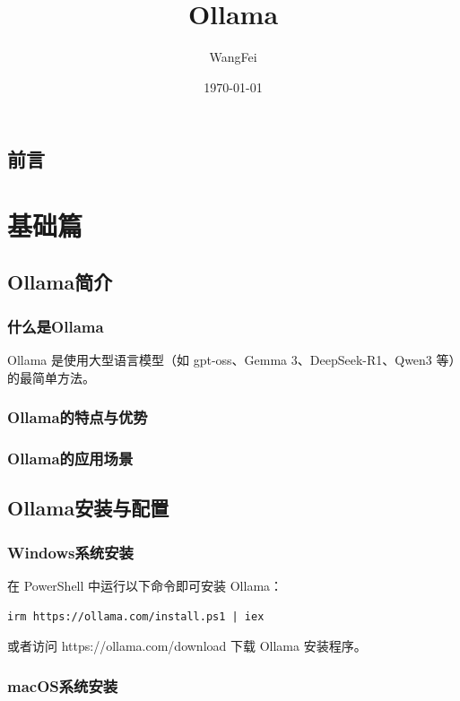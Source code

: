 \documentclass[12pt,UTF8]{ctexbook}
\title{\heiti\zihao{0} Ollama}
\author{WangFei}
\date{\today}
\begin{document}
\maketitle
\tableofcontents

\frontmatter
\chapter{前言}

\mainmatter

\part{基础篇}
\chapter{Ollama简介}
\section{什么是Ollama}

Ollama 是使用大型语言模型（如 gpt-oss、Gemma 3、DeepSeek-R1、Qwen3 等）的最简单方法。

\section{Ollama的特点与优势}
\section{Ollama的应用场景}

\chapter{Ollama安装与配置}
\section{Windows系统安装}

在 PowerShell 中运行以下命令即可安装 Ollama：

\begin{verbatim}
irm https://ollama.com/install.ps1 | iex
\end{verbatim}

或者访问 https://ollama.com/download 下载 Ollama 安装程序。

\section{macOS系统安装}
\end{document}
